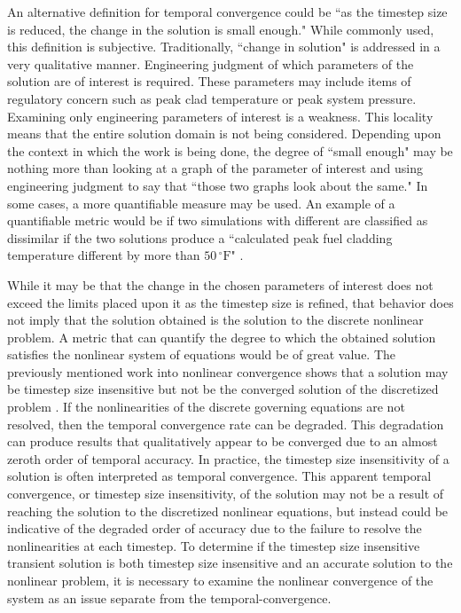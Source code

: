 An alternative definition for temporal convergence could be ``as the timestep size is reduced, the change in the solution is small enough."
While commonly used, this definition is subjective.
Traditionally, ``change in solution" is addressed in a very qualitative manner.
Engineering judgment of which parameters of the solution are of interest is required.
These parameters may include items of regulatory concern such as peak clad temperature or peak system pressure.
Examining only engineering parameters of interest is a weakness.
This locality means that the entire solution domain is not being considered.
Depending upon the context in which the work is being done, the degree of ``small enough" may be nothing more than looking at a graph of the parameter of interest and using engineering judgment to say that ``those two graphs look about the same."
In some cases, a more quantifiable measure may be used.
An example of a quantifiable metric would be if two simulations with different \dtmax{} are classified as dissimilar if the two solutions produce a ``calculated peak fuel cladding temperature different by more than $50\,^{\circ}\mathrm{F}$" \cite{CFR10}.

While it may be that the change in the chosen parameters of interest does not exceed the limits placed upon it as the timestep size is refined, that behavior does not imply that the solution obtained is the solution to the discrete nonlinear problem.
A metric that can quantify the degree to which the obtained solution satisfies the nonlinear system of equations would be of great value.
The previously mentioned work into nonlinear convergence shows that a solution may be timestep size insensitive but not be the converged solution of the discretized problem \cite{Knoll2001}.
If the nonlinearities of the discrete governing equations are not resolved, then the temporal convergence rate can be degraded.
This degradation can produce results that qualitatively appear to be converged due to an almost zeroth order of temporal accuracy.
In practice, the timestep size insensitivity of a solution is often interpreted as temporal convergence.
This apparent temporal convergence, or timestep size insensitivity, of the solution may not be a result of reaching the solution to the discretized nonlinear equations, but instead could be indicative of the degraded order of accuracy due to the failure to resolve the nonlinearities at each timestep.
To determine if the timestep size insensitive transient solution is both timestep size insensitive and an accurate solution to the nonlinear problem, it is necessary to examine the nonlinear convergence of the system as an issue separate from the temporal-convergence.

